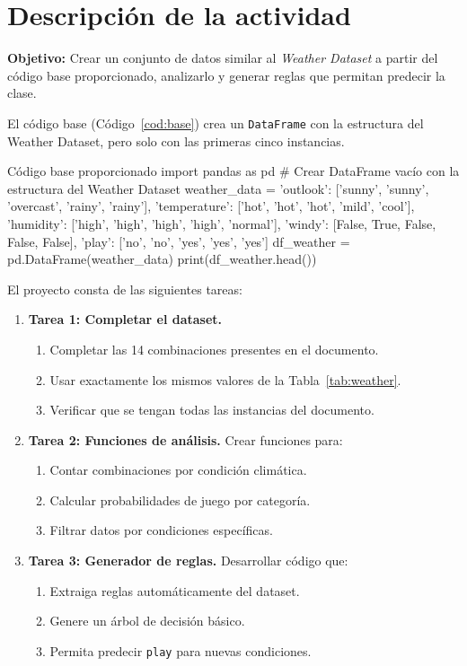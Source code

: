 \documentclass[11pt,letterpaper]{article}
\begin{document}
\section{Descripción de la actividad}

\textbf{Objetivo:} Crear un conjunto de datos similar al \textit{Weather Dataset} a partir del código base proporcionado, analizarlo y generar reglas que permitan predecir la clase.

El código base (Código~\ref{cod:base}) crea un \texttt{DataFrame} con la estructura del Weather Dataset, pero solo con las primeras cinco instancias.

\begin{codigo}[label=cod:base]{Código base proporcionado}
import pandas as pd
# Crear DataFrame vacío con la estructura del Weather Dataset
weather_data = {
'outlook': ['sunny', 'sunny', 'overcast', 'rainy', 'rainy'],
'temperature': ['hot', 'hot', 'hot', 'mild', 'cool'],
'humidity': ['high', 'high', 'high', 'high', 'normal'],
'windy': [False, True, False, False, False],
'play': ['no', 'no', 'yes', 'yes', 'yes']
}
df_weather = pd.DataFrame(weather_data)
print(df_weather.head())
\end{codigo}

El proyecto consta de las siguientes tareas:

\begin{enumerate}
    \item \textbf{Tarea 1: Completar el dataset.}
    \begin{enumerate}
        \item Completar las 14 combinaciones presentes en el documento.
        \item Usar exactamente los mismos valores de la Tabla~\ref{tab:weather}.
        \item Verificar que se tengan todas las instancias del documento.
    \end{enumerate}
    \item \textbf{Tarea 2: Funciones de análisis.} Crear funciones para:
    \begin{enumerate}
        \item Contar combinaciones por condición climática.
        \item Calcular probabilidades de juego por categoría.
        \item Filtrar datos por condiciones específicas.
    \end{enumerate}
    \item \textbf{Tarea 3: Generador de reglas.} Desarrollar código que:
    \begin{enumerate}
        \item Extraiga reglas automáticamente del dataset.
        \item Genere un árbol de decisión básico.
        \item Permita predecir \texttt{play} para nuevas condiciones.
    \end{enumerate}
\end{enumerate}
\end{document}
